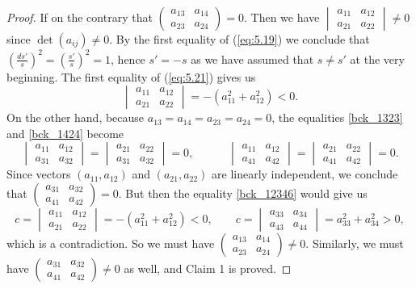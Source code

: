 \documentclass{amsart}
\numberwithin{equation}{section}
\theoremstyle{definition}
\renewcommand{\1}{\mathds{1}}
\renewcommand{\>}{\rightarrow}
\begin{document}
\begin{proof}
If on the contrary that $\begin{pmatrix}a_{13} & a_{14} \\ a_{23} & a_{24} \end{pmatrix}=0$. Then we have $
\begin{vmatrix}a_{11} & a_{12} \\ a_{21} & a_{22} \end{vmatrix} \neq 0$ since $\det(a_{ij}) \neq 0$.
By the first equality of (\ref{eq:5.19}) we conclude that $(\frac{ds'}{s})^2=(\frac{s'}{s})^2=1$, hence $s'=-s$ as we have assumed that  $s \neq s'$ at the very beginning. The first equality of (\ref{eq:5.21}) gives us
$$
\begin{vmatrix}a_{11} & a_{12} \\ a_{21} & a_{22} \end{vmatrix}=  -(a_{11}^2+a_{12}^2) <0.
$$
On the other hand, because $a_{13}=a_{14}=a_{23}=a_{24}=0$,  the equalities \eqref{bck_1323} and \eqref{bck_1424} become
\[\begin{vmatrix}a_{11} & a_{12} \\ a_{31} & a_{32} \end{vmatrix}=\begin{vmatrix}a_{21} & a_{22} \\ a_{31} & a_{32} \end{vmatrix}=0,\quad \quad \quad
\begin{vmatrix}a_{11} & a_{12} \\ a_{41} & a_{42} \end{vmatrix}=\begin{vmatrix}a_{21} & a_{22} \\ a_{41} & a_{42} \end{vmatrix}=0.\]
Since vectors $(a_{11},a_{12})$ and $(a_{21},a_{22})$ are linearly independent, we conclude that
$\begin{pmatrix}a_{31} & a_{32} \\ a_{41} & a_{42} \end{pmatrix} =0$. But then
the equality \eqref{bck_12346} would give us
\[c=\begin{vmatrix}a_{11} & a_{12} \\ a_{21} & a_{22} \end{vmatrix}=-(a_{11}^2+a_{12}^2)<0,\quad \quad
c=\begin{vmatrix} a_{33} & a_{34} \\ a_{43} & a_{44} \end{vmatrix}=a_{33}^2+a_{34}^2>0,\]
which is a contradiction. So we must have $\begin{pmatrix}a_{13} & a_{14} \\ a_{23} & a_{24} \end{pmatrix} \neq 0$. Similarly, we must have
 $\begin{pmatrix}a_{31} & a_{32} \\ a_{41} & a_{42} \end{pmatrix} \neq 0$ as well, and Claim 1 is proved.
\vspace{0.2cm}


\end{proof}
\end{document}
